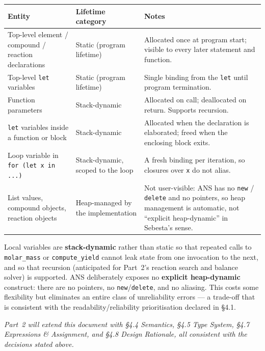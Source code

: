 \documentclass[11pt,a4paper]{article}
\newcommand{\thd}[1]{\textbf{\color{white}#1}}
\newcommand{\code}[1]{\texttt{#1}}
\begin{document}
{\footnotesize
{}
\begin{tabularx}{\linewidth}{@{}>{\RaggedRight\arraybackslash}p{5.0cm}
                               >{\RaggedRight\arraybackslash}p{4.0cm}
                               Y@{}}
\toprule
{}\thd{Entity} & \thd{Lifetime category} & \thd{Notes}\\
\midrule
Top-level element / compound / reaction declarations
  & Static (program lifetime)
  & Allocated once at program start; visible to every later statement and
    function.\\
Top-level \code{let} variables
  & Static (program lifetime)
  & Single binding from the \code{let} until program termination.\\
Function parameters
  & Stack-dynamic
  & Allocated on call; deallocated on return. Supports recursion.\\
\code{let} variables inside a function or block
  & Stack-dynamic
  & Allocated when the declaration is elaborated; freed when the enclosing
    block exits.\\
Loop variable in \code{for (let x in ...)}
  & Stack-dynamic, scoped to the loop
  & A fresh binding per iteration, so closures over \code{x} do not alias.\\
List values, compound objects, reaction objects
  & Heap-managed by the implementation
  & Not user-visible: ANS has no \code{new} / \code{delete} and no pointers,
    so heap management is automatic, not ``explicit heap-dynamic'' in
    Sebesta's sense.\\
\bottomrule
\end{tabularx}}
\par\vspace{2pt}

Local variables are \textbf{stack-dynamic} rather than static so that
repeated calls to \code{molar\_mass} or \code{compute\_yield} cannot leak
state from one invocation to the next, and so that recursion (anticipated for
Part~2's reaction search and balance solver) is supported. ANS deliberately
exposes no \textbf{explicit heap-dynamic} construct: there are no pointers,
no \code{new}/\code{delete}, and no aliasing. This costs some flexibility but
eliminates an entire class of unreliability errors --- a trade-off that is
consistent with the readability/reliability prioritisation declared in
\S4.1.

\vspace{6pt}
{\footnotesize\itshape\color{anscaption}
Part~2 will extend this document with \S4.4 Semantics, \S4.5 Type System,
\S4.7 Expressions \& Assignment, and \S4.8 Design Rationale, all consistent
with the decisions stated above.\par}
\end{document}
